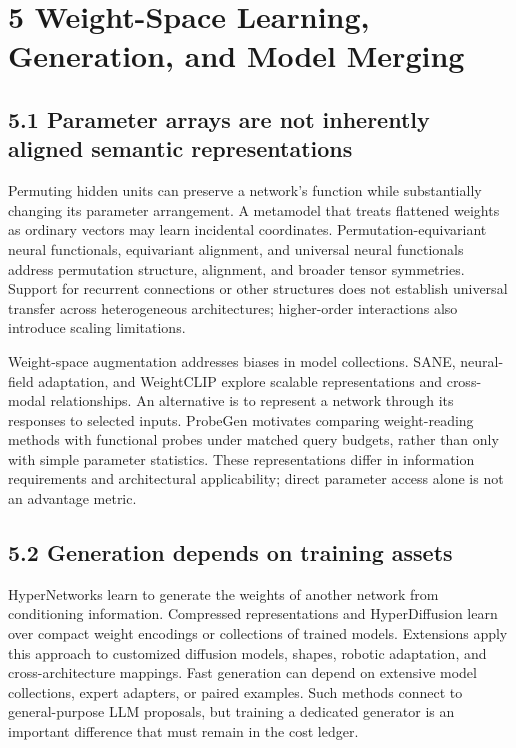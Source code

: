 \section*{5 Weight-Space Learning, Generation, and Model Merging}

\subsection*{5.1 Parameter arrays are not inherently aligned semantic representations}

Permuting hidden units can preserve a network's function while substantially changing its parameter arrangement. A metamodel that treats flattened weights as ordinary vectors may learn incidental coordinates. Permutation-equivariant neural functionals, equivariant alignment, and universal neural functionals address permutation structure, alignment, and broader tensor symmetries.\cite{r12,r18,r22} Support for recurrent connections or other structures does not establish universal transfer across heterogeneous architectures; higher-order interactions also introduce scaling limitations.\cite{r22}


Weight-space augmentation addresses biases in model collections. SANE, neural-field adaptation, and WeightCLIP explore scalable representations and cross-modal relationships.\cite{r21,r28,r42,r45} An alternative is to represent a network through its responses to selected inputs. ProbeGen motivates comparing weight-reading methods with functional probes under matched query budgets, rather than only with simple parameter statistics.\cite{r33} These representations differ in information requirements and architectural applicability; direct parameter access alone is not an advantage metric.


\subsection*{5.2 Generation depends on training assets}

HyperNetworks learn to generate the weights of another network from conditioning information. Compressed representations and HyperDiffusion learn over compact weight encodings or collections of trained models.\cite{r2,r5,r14} Extensions apply this approach to customized diffusion models, shapes, robotic adaptation, and cross-architecture mappings.\cite{r27,r39,r44,r46} Fast generation can depend on extensive model collections, expert adapters, or paired examples. Such methods connect to general-purpose LLM proposals, but training a dedicated generator is an important difference that must remain in the cost ledger.


